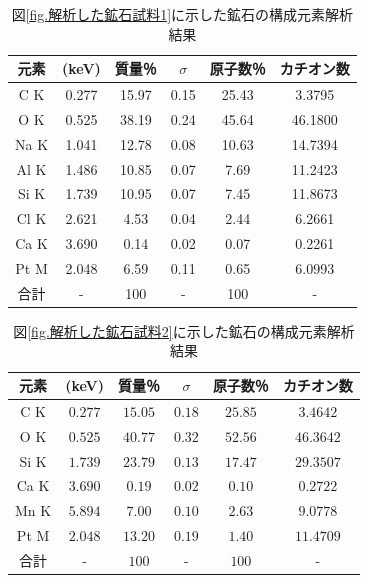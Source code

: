 \documentclass[titlepage,fontsize=10.5pt]{jlreq}
\begin{document}
\begin{table}[H]
    \centering
    \caption{図\ref{fig.解析した鉱石試料1}に示した鉱石の構成元素解析結果}
    \label{tab.鉱石１構成元素解析結果}
    \begin{tabular}{cccccc}
        元素 & (\unit{\kilo\electronvolt}) & 質量％ & $\sigma$ & 原子数％ & カチオン数 \\\hline\hline
        C  K & 0.277 & 15.97 & 0.15 & 25.43 & 3.3795 \\
        O  K & 0.525 & 38.19 & 0.24 & 45.64 & 46.1800 \\
        Na K & 1.041 & 12.78 & 0.08 & 10.63 & 14.7394 \\
        Al K & 1.486 & 10.85 & 0.07 & 7.69 & 11.2423 \\
        Si K & 1.739 & 10.95 & 0.07 & 7.45 & 11.8673 \\
        Cl K & 2.621 & 4.53 & 0.04 & 2.44 & 6.2661 \\
        Ca K & 3.690 & 0.14 & 0.02 & 0.07 & 0.2261 \\
        Pt M & 2.048 & 6.59 & 0.11 & 0.65 & 6.0993 \\ \hline
        合計 & - & 100 & - & 100 & - 
    \end{tabular}
\end{table}
\begin{table}[H]
    \centering
    \caption{図\ref{fig.解析した鉱石試料2}に示した鉱石の構成元素解析結果}
    \label{tab.鉱石２構成元素解析結果}
    \begin{tabular}{cccccc}
        元素 & (\unit{\kilo\electronvolt}) & 質量％ & $\sigma$ & 原子数％ & カチオン数 \\\hline\hline
        C  K & $0.277$ & $15.05$  & $0.18$ & $25.85$ & $3.4642$ \\
        O  K & $0.525$ & $40.77$  & $0.32$ & $52.56$ & $46.3642$ \\
        Si K & $1.739$ & $23.79$  & $0.13$ & $17.47$ & $29.3507$ \\
        Ca K & $3.690$ & $0.19 $ & $0.02$ & $0.10$ & $0.2722$ \\
        Mn K & $5.894$ & $7.00 $ & $0.10$ & $2.63$ & $9.0778$ \\
        Pt M & $2.048$ & $13.20$  & $0.19$ & $1.40$ & $11.4709$ \\ \hline
        合計 & - & $100$ & - & $100$ & - 
    \end{tabular}
\end{table}
\end{document}
